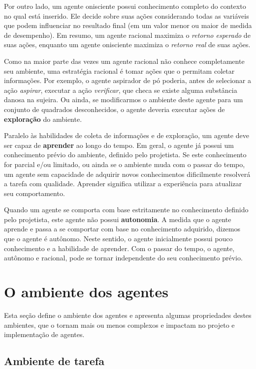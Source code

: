 Por outro lado, um agente onisciente possui conhecimento completo do contexto no qual está inserido. Ele decide sobre suas ações considerando todas as variáveis que podem influenciar no resultado final (em um valor menor ou maior de medida de desempenho). Em resumo, um agente racional maximiza o \textit{retorno esperado} de suas ações, enquanto um agente onisciente maximiza o \textit{retorno real} de suas ações.

Como na maior parte das vezes um agente racional não conhece completamente seu ambiente, uma estratégia racional é tomar ações que o permitam coletar informações. Por exemplo, o agente aspirador de pó poderia, antes de selecionar a ação \textit{aspirar}, executar a ação \textit{verificar}, que checa se existe alguma substância danosa na sujeira. Ou ainda, se modificarmos o ambiente deste agente para um conjunto de quadrados desconhecidos, o agente deveria executar ações de \textbf{exploração} do ambiente.

Paralelo às habilidades de coleta de informações e de exploração, um agente deve ser capaz de \textbf{aprender} ao longo do tempo. Em geral, o agente já possui um conhecimento prévio do ambiente, definido pelo projetista. Se este conhecimento for parcial e/ou limitado, ou ainda se o ambiente muda com o passar do tempo, um agente sem capacidade de adquirir novos conhecimentos dificilmente resolverá a tarefa com qualidade. Aprender significa utilizar a experiência para atualizar seu comportamento.

Quando um agente se comporta com base estritamente no conhecimento definido pelo projetista, este agente não possui \textbf{autonomia}. A medida que o agente aprende e passa a se comportar com base no conhecimento adquirido, dizemos que o agente é autônomo. Neste sentido, o agente inicialmente possui pouco conhecimento e a habilidade de aprender. Com o passar do tempo, o agente, autônomo e racional, pode se tornar independente do seu conhecimento prévio.

\section{O ambiente dos agentes}

Esta seção define o ambiente dos agentes e apresenta algumas propriedades destes ambientes, que o tornam mais ou menos complexos e impactam no projeto e implementação de agentes.

\subsection{Ambiente de tarefa}


